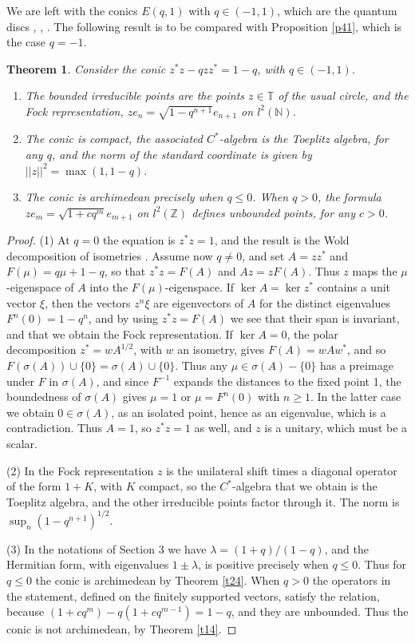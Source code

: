 \documentclass[11pt]{amsart}
\newtheorem{theorem}{Theorem}[section]
\theoremstyle{definition}
\begin{document}
We are left with the conics $E(q,1)$ with $q\in(-1,1)$, which are the quantum discs \cite{jsw}, \cite{kle}, \cite{pwo}. The following result is to be compared with Proposition \ref{p41}, which is the case $q=-1$.

\begin{theorem}\label{t43}
Consider the conic $z^*z-qzz^*=1-q$, with $q\in(-1,1)$.
\begin{enumerate}
\item The bounded irreducible points are the points $z\in\mathbb T$ of the usual circle, and the Fock representation, $ze_n=\sqrt{1-q^{n+1}}e_{n+1}$ on $l^2(\mathbb N)$.

\item The conic is compact, the associated $C^*$-algebra is the Toeplitz algebra, for any $q$, and the norm of the standard coordinate is given by $||z||^2=\max(1,1-q)$.

\item The conic is archimedean precisely when $q\leq0$. When $q>0$, the formula $ze_m=\sqrt{1+cq^m}e_{m+1}$ on $l^2(\mathbb Z)$ defines unbounded points, for any $c>0$.
\end{enumerate}
\end{theorem}

\begin{proof}
(1) At $q=0$ the equation is $z^*z=1$, and the result is the Wold decomposition of isometries \cite{cob}. Assume now $q\neq0$, and set $A=zz^*$ and $F(\mu)=q\mu+1-q$, so that $z^*z=F(A)$ and $Az=zF(A)$. Thus $z$ maps the $\mu$-eigenspace of $A$ into the $F(\mu)$-eigenspace. If $\ker A=\ker z^*$ contains a unit vector $\xi$, then the vectors $z^n\xi$ are eigenvectors of $A$ for the distinct eigenvalues $F^n(0)=1-q^n$, and by using $z^*z=F(A)$ we see that their span is invariant, and that we obtain the Fock representation. If $\ker A=0$, the polar decomposition $z^*=wA^{1/2}$, with $w$ an isometry, gives $F(A)=wAw^*$, and so $F(\sigma(A))\cup\{0\}=\sigma(A)\cup\{0\}$. Thus any $\mu\in\sigma(A)-\{0\}$ has a preimage under $F$ in $\sigma(A)$, and since $F^{-1}$ expands the distances to the fixed point 1, the boundedness of $\sigma(A)$ gives $\mu=1$ or $\mu=F^n(0)$ with $n\geq1$. In the latter case we obtain $0\in\sigma(A)$, as an isolated point, hence as an eigenvalue, which is a contradiction. Thus $A=1$, so $z^*z=1$ as well, and $z$ is a unitary, which must be a scalar.

(2) In the Fock representation $z$ is the unilateral shift times a diagonal operator of the form $1+K$, with $K$ compact, so the $C^*$-algebra that we obtain is the Toeplitz algebra, and the other irreducible points factor through it. The norm is $\sup_n(1-q^{n+1})^{1/2}$.

(3) In the notations of Section 3 we have $\lambda=(1+q)/(1-q)$, and the Hermitian form, with eigenvalues $1\pm\lambda$, is positive precisely when $q\leq0$. Thus for $q\leq0$ the conic is archimedean by Theorem \ref{t24}. When $q>0$ the operators in the statement, defined on the finitely supported vectors, satisfy the relation, because $(1+cq^m)-q(1+cq^{m-1})=1-q$, and they are unbounded. Thus the conic is not archimedean, by Theorem \ref{t14}.
\end{proof}
\end{document}
